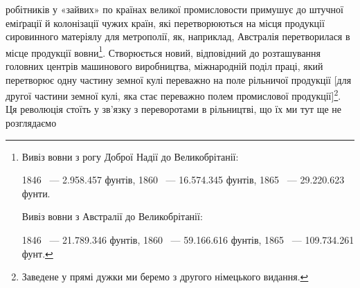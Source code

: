 робітників у «зайвих» по країнах великої промисловости примушує
до штучної еміґрації й колонізації чужих країн, які перетворюються
на місця продукції сировинного матеріялу для метрополії,
як, наприклад, Австралія перетворилася в місце продукції
вовни\footnote{
\noindent{}Вивіз вовни з рогу Доброї Надії до Великобрітанії:

\noindent{}1846~ — \num{2.958.457} фунтів, 1860~ — \num{16.574.345} фунтів, 1865~ —
\num{29.220.623} фунти.

\noindent{}Вивіз вовни з Австралії до Великобрітанії:

\noindent{}1846~ — \num{21.789.346} фунтів, 1860~ — \num{59.166.616} фунтів, 1865~ —
\num{109.734.261} фунт.
}. Створюється новий, відповідний до розташування головних
центрів машинового виробництва, міжнародній поділ праці,
який перетворює одну частину земної кулі переважно на поле
рільничої продукції [для другої частини земної кулі, яка стає
переважно полем промислової продукції]\footnote*{
Заведене у прямі дужки ми беремо з другого німецького видання.
}. Ця революція стоїть
у зв’язку з переворотами в рільництві, що їх ми тут ще не розглядаємо
